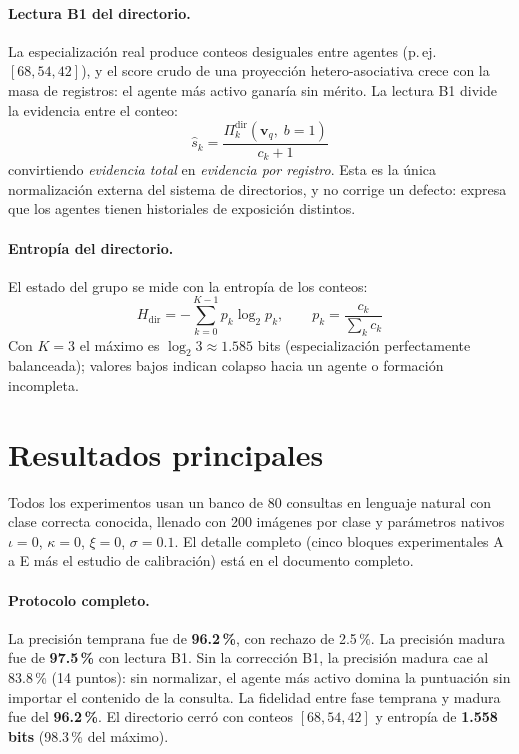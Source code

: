 \documentclass[11pt]{article}
\begin{document}
\paragraph{Lectura B1 del directorio.}
La especialización real produce conteos desiguales entre agentes (p.\,ej.\
$[68, 54, 42]$), y el score crudo de una proyección hetero-asociativa crece con
la masa de registros: el agente más activo ganaría sin mérito.
La lectura B1 divide la evidencia entre el conteo:
\begin{equation}
    \hat{s}_k = \frac{\Pi^{\mathrm{dir}}_k(\mathbf{v}_q,\; b{=}1)}{c_k + 1}
    \label{eq:b1}
\end{equation}
convirtiendo \emph{evidencia total} en \emph{evidencia por registro}.
Esta es la única normalización externa del sistema de directorios, y no corrige
un defecto: expresa que los agentes tienen historiales de exposición distintos.

\paragraph{Entropía del directorio.}
El estado del grupo se mide con la entropía de los conteos:
\begin{equation}
    H_{\mathrm{dir}} = -\sum_{k=0}^{K-1} p_k \log_2 p_k,
    \qquad p_k = \frac{c_k}{\sum_k c_k}
    \label{eq:entropia-dir}
\end{equation}
Con $K{=}3$ el máximo es $\log_2 3 \approx 1.585$ bits (especialización
perfectamente balanceada); valores bajos indican colapso hacia un agente o
formación incompleta.

\section{Resultados principales}

Todos los experimentos usan un banco de 80 consultas en lenguaje natural con
clase correcta conocida, llenado con 200 imágenes por clase y parámetros nativos
$\iota = 0$, $\kappa = 0$, $\xi = 0$, $\sigma = 0.1$.
El detalle completo (cinco bloques experimentales A a E más el estudio de
calibración) está en el documento completo.

\paragraph{Protocolo completo.}
La precisión temprana fue de \textbf{96.2\,\%}, con rechazo de 2.5\,\%.
La precisión madura fue de \textbf{97.5\,\%} con lectura B1.
Sin la corrección B1, la precisión madura cae al 83.8\,\% (14 puntos): sin
normalizar, el agente más activo domina la puntuación sin importar el contenido
de la consulta.
La fidelidad entre fase temprana y madura fue del \textbf{96.2\,\%}.
El directorio cerró con conteos $[68, 54, 42]$ y entropía de
\textbf{1.558 bits} (98.3\,\% del máximo).
\end{document}
